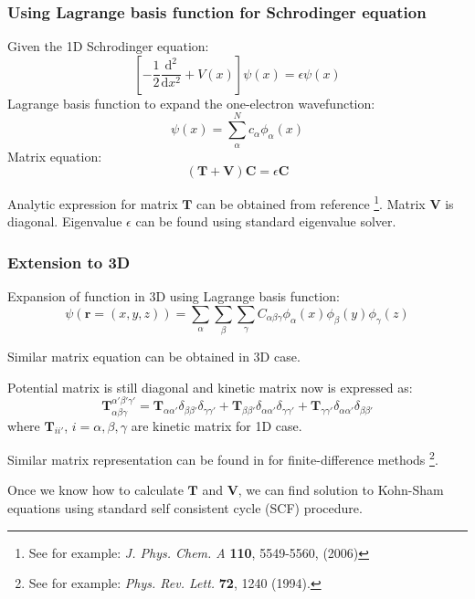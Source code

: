 \documentclass[10pt,t]{beamer}
\begin{document}
\begin{frame}
\frametitle{Using Lagrange basis function for Schrodinger equation}

Given the 1D Schrodinger equation:
\begin{equation*}
\left[ -\frac{1}{2}\frac{\mathrm{d}^2}{\mathrm{d}x^2} + V(x)\right ] \psi(x)
= \epsilon \psi(x)
\end{equation*}
Lagrange basis function to expand the one-electron wavefunction:
\begin{equation*}
\psi(x) = \sum_{\alpha}^{N} c_{\alpha} \phi_{\alpha}(x)
\end{equation*}
Matrix equation:
\begin{equation*}
\left( \mathbf{T} + \mathbf{V} \right) \mathbf{C} = \epsilon \mathbf{C}
\end{equation*}

Analytic expression for matrix $\mathbf{T}$ can be obtained from reference
\footnote{See for example: \textit{J. Phys. Chem. A}
\textbf{110}, {5549-5560}, (2006)}.
Matrix $\mathbf{V}$ is diagonal.
Eigenvalue $\epsilon$ can be found using standard eigenvalue solver.

\end{frame}



\begin{frame}
\frametitle{Extension to 3D}

Expansion of function in 3D using Lagrange basis function:
\begin{equation*}
\psi(\mathbf{r} = (x,y,z)) =
\sum_{\alpha}\sum_{\beta}\sum_{\gamma} C_{\alpha\beta\gamma}
\phi_{\alpha}(x) \phi_{\beta}(y) \phi_{\gamma}(z)
\end{equation*}

Similar matrix equation can be obtained in 3D case.

Potential matrix is still diagonal and kinetic matrix now is expressed as:
\begin{equation*}
\mathbf{T}_{\alpha\beta\gamma}^{\alpha'\beta'\gamma'} =
\mathbf{T}_{\alpha\alpha'}\delta_{\beta\beta'}\delta_{\gamma\gamma'} +
\mathbf{T}_{\beta\beta'}\delta_{\alpha\alpha'}\delta_{\gamma\gamma'} +
\mathbf{T}_{\gamma\gamma'}\delta_{\alpha\alpha'}\delta_{\beta\beta'}
\end{equation*}
where $\mathbf{T}_{ii'}$, $i=\alpha,\beta,\gamma$ are kinetic matrix for 1D case.

Similar matrix representation can be found in for finite-difference methods
\footnote{See for example: \textit{Phys. Rev. Lett.} \textbf{72}, 1240 (1994).}.

Once we know how to calculate $\mathbf{T}$ and $\mathbf{V}$, we can find
solution to Kohn-Sham equations using standard self consistent cycle (SCF) procedure.

\end{frame}
  
\end{document}
